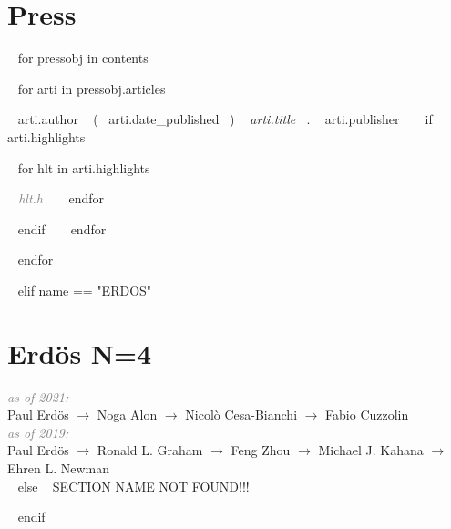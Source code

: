 \section{Press}

~{ for pressobj in contents }~ 
\begin{etaremune}[itemindent=-1.5\bibhang, topsep=0pt,
				   itemsep=\bibsep,partopsep=0pt,parsep=0pt,leftmargin={\bibhang+\widthof{[999]}}] 
    
    ~{ for arti in pressobj.articles }~
    \item ~{{ arti.author }}~ (~{{ arti.date_published }}~) \textit{~{{ arti.title }}~}. ~{{ arti.publisher }}~
     ~{ if arti.highlights }~
     	\begin{innerlist}
     	~{ for hlt in arti.highlights }~
	     \item  \textcolor{grey}{\textit{~{{ hlt.h }}~} }
     	~{ endfor }~
     	\end{innerlist}
     ~{ endif }~
	~{ endfor }~


\end{etaremune}
~{ endfor }~













~{ elif name == "ERDOS" }~

\section{Erdös N=4}

\textit{\textcolor{grey}{as of 2021:}}\\
Paul Erdös $\rightarrow$ Noga Alon $\rightarrow$ Nicolò Cesa-Bianchi $\rightarrow$ Fabio Cuzzolin\\

\textit{\textcolor{grey}{as of 2019:}}\\
Paul Erdös $\rightarrow$ Ronald L. Graham $\rightarrow$ Feng Zhou $\rightarrow$ Michael J. Kahana $\rightarrow$ Ehren L. Newman\\





~{ else }~
SECTION NAME NOT FOUND!!!


~{ endif }~











